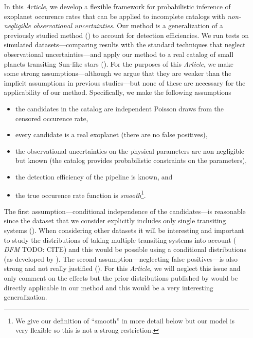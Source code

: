 \documentclass[12pt,preprint]{aastex}
\newcommand{\paper}{\textsl{Article}}
\newcommand{\todo}[3]{{\color{#2} \emph{#1} TODO: #3}}
\newcommand{\dfmtodo}[1]{\todo{DFM}{red}{#1}}
\begin{document}
In this \paper, we develop a flexible framework for probabilistic inference of
exoplanet occurence rates that can be applied to incomplete catalogs with
\emph{non-negligible observational uncertainties}.
Our method is a generalization of a previously studied method
(\citealt{hogge}) to account for detection efficiencies.
We run tests on simulated datasets---comparing results with the standard
techniques that neglect observational uncertainties---and apply our method to
a real catalog of small planets transiting Sun-like stars
(\citealt{petigura}).
For the purposes of this \paper, we make some strong assumptions---although we
argue that they are weaker than the implicit assumptions in previous
studies---but none of these are necessary for the applicability of our method.
Specifically, we make the following assumptions
\begin{itemize}

\item the candidates in the catalog are independent Poisson draws from the
censored occurence rate,

\item every candidate is a real exoplanet (there are no false positives),

\item the observational uncertainties on the physical parameters are
non-negligible but known (the catalog provides probabilistic constraints on
the parameters),

\item the detection efficiency of the pipeline is known, and

\item the true occurence rate function is \emph{smooth}\footnote{We give our
definition of ``smooth'' in more detail below but our model is very flexible
so this is not a strong restriction.}.

\end{itemize}
The first assumption---conditional independence of the candidates---is
reasonable since the dataset that we consider explicitly includes only single
transiting systems (\citealt{petigura}).
When considering other datasets it will be interesting and important to study
the distributions of taking multiple transiting systems into account
(\dfmtodo{CITE}) and this would be possible using a conditional distributions
(as developed by \citealt{tremaine}).
The second assumption---neglecting false positives---is also strong and not
really justified (\citealt{fressin-fp, morton}).
For this \paper, we will neglect this issue and only comment on the effects
but the prior distributions published by \citet{fressin-fp} would be directly
applicable in our method and this would be a very interesting generalization.
\end{document}
